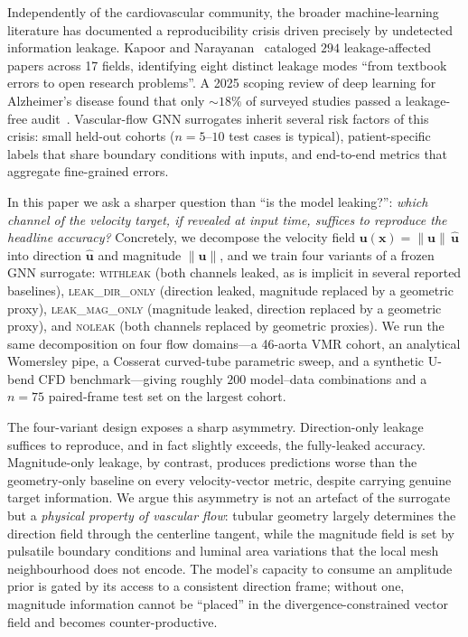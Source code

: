 \documentclass[10pt,a4paper]{article}
\newcommand{\withleak}{\textsc{withleak}}
\newcommand{\dironly}{\textsc{leak\_dir\_only}}
\newcommand{\magonly}{\textsc{leak\_mag\_only}}
\newcommand{\noleak}{\textsc{noleak}}
\newcommand{\unit}[1]{\hat{\mathbf{#1}}}
\begin{document}
Independently of the cardiovascular community, the broader
machine-learning literature has documented a reproducibility crisis
driven precisely by undetected information leakage. Kapoor and
Narayanan~\cite{kapoor2023leakage} cataloged $294$ leakage-affected
papers across 17 fields, identifying eight distinct leakage modes
``from textbook errors to open research problems''. A 2025 scoping
review of deep learning for Alzheimer's disease found that only
$\sim\!18\%$ of surveyed studies passed a leakage-free
audit~\cite{alzheimer2025scoping}.
Vascular-flow GNN surrogates inherit several risk factors of this
crisis: small held-out cohorts ($n \!=\! 5$--$10$ test cases is
typical), patient-specific labels that share boundary conditions with
inputs, and end-to-end metrics that aggregate fine-grained errors.

In this paper we ask a sharper question than ``is the model
leaking?'': \emph{which channel of the velocity target, if revealed at
input time, suffices to reproduce the headline accuracy?} Concretely,
we decompose the velocity field $\mathbf{u}(\mathbf{x}) \!=\!
\|\mathbf{u}\|\,\unit{u}$ into direction $\unit{u}$ and magnitude
$\|\mathbf{u}\|$, and we train four variants of a frozen GNN
surrogate: \withleak{} (both channels leaked, as is implicit in
several reported baselines), \dironly{} (direction leaked, magnitude
replaced by a geometric proxy), \magonly{} (magnitude leaked, direction
replaced by a geometric proxy), and \noleak{} (both channels replaced
by geometric proxies). We run the same decomposition on four flow
domains---a 46-aorta VMR cohort, an analytical Womersley pipe, a
Cosserat curved-tube parametric sweep, and a synthetic U-bend CFD
benchmark---giving roughly $200$ model--data combinations and a
$n\!=\!75$ paired-frame test set on the largest cohort.

The four-variant design exposes a sharp asymmetry. Direction-only
leakage suffices to reproduce, and in fact slightly exceeds, the
fully-leaked accuracy. Magnitude-only leakage, by contrast, produces
predictions worse than the geometry-only baseline on every
velocity-vector metric, despite carrying genuine target information.
We argue this asymmetry is not an artefact of the surrogate but a
\emph{physical property of vascular flow}: tubular geometry largely
determines the direction field through the centerline tangent, while
the magnitude field is set by pulsatile boundary conditions and
luminal area variations that the local mesh neighbourhood does not
encode. The model's capacity to consume an amplitude prior is gated by
its access to a consistent direction frame; without one, magnitude
information cannot be ``placed'' in the divergence-constrained vector
field and becomes counter-productive.
\end{document}
